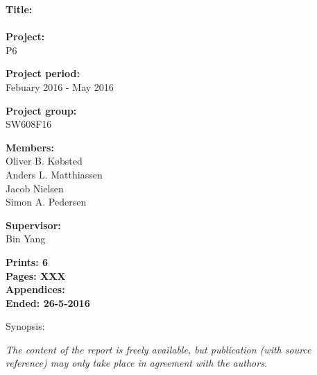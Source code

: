 \begin{minipage}[t]{0.48\textwidth}
\textbf{Title:} \\[5pt]\bigskip\hspace{2ex}    
\name\\
\textbf{Project:} \\[5pt]\bigskip\hspace{2ex}
P6

\textbf{Project period:} \\[5pt]\bigskip\hspace{2ex}
Febuary 2016 - May 2016

\textbf{Project group:} \\[5pt]\bigskip\hspace{2ex}
SW608F16

\textbf{Members:} \\[5pt]\hspace*{2ex}
Oliver B. Købsted \\\hspace*{2ex}
Anders L. Matthiassen \\\hspace*{2ex}
Jacob Nielsen \\\hspace*{2ex}
Simon A. Pedersen \\\hspace*{2ex}


\textbf{Supervisor:} \\[5pt]\hspace*{2ex}
Bin Yang


\vspace*{1cm}

\textbf{Prints: 6} \\
\textbf{Pages: XXX} \\
\textbf{Appendices: } \\
\textbf{Ended: 26-5-2016}

\end{minipage}
\hfill
\begin{minipage}[t]{0.483\textwidth}
Synopsis: \\[5pt]
\fbox{\parbox{7cm}{\bigskip\bigskip}}
\end{minipage}

\vfill

{\footnotesize\itshape The content of the report is freely available, but publication (with source reference) may only take place in agreement with the authors.}

